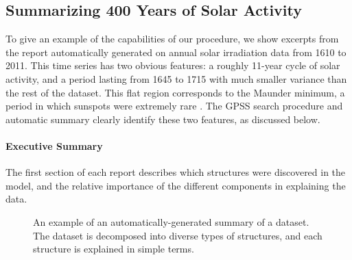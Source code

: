 \documentclass{article}
\begin{document}
\subsection{Summarizing 400 Years of Solar Activity}
\label{sec:solar}

To give an example of the capabilities of our procedure, we show excerpts from the report automatically generated on annual solar irradiation data from 1610 to 2011.  This time series has two obvious features: a roughly 11-year cycle of solar activity, and a period lasting from 1645 to 1715 with much smaller variance than the rest of the dataset.  This flat region corresponds to the Maunder minimum, a period in which sunspots were extremely rare \citep{lean1995reconstruction}.
%
The GPSS search procedure and automatic summary clearly identify these two features, as discussed below.

\paragraph{Executive Summary}

The first section of each report describes which structures were discovered in the model, and the relative importance of the different components in explaining the data.

\begin{figure}[h]
\centering
{}
\caption{
An example of an automatically-generated summary of a dataset.  The dataset is decomposed into diverse types of structures, and each structure is explained in simple terms.}
\label{fig:exec}
\end{figure}
\end{document}
